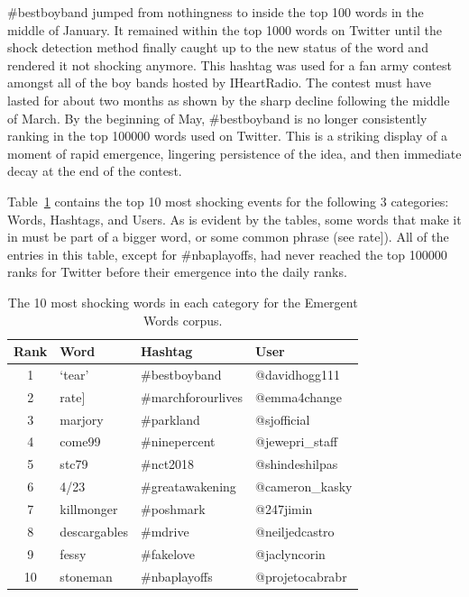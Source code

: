 \documentclass{article}
\begin{document}
\#bestboyband jumped from nothingness to inside the top 100 words in the middle
of January.
It remained within the top 1000 words on Twitter until the shock detection
method finally caught up to the new status of the word and rendered it not 
shocking anymore.
This hashtag was used for a fan army contest amongst all of the boy bands
hosted by IHeartRadio.
The contest must have lasted for about two months as shown by the sharp decline
following the middle of March.
By the beginning of May,
\#bestboyband is no longer consistently ranking in the top 100000 words used
on Twitter.
This is a striking display of a moment of rapid emergence,
lingering persistence of the idea,
and then immediate decay at the end of the contest.\par

Table~\ref{Tab:Emergent} contains the top 10 most shocking events for the
following 3 categories:
Words,
Hashtags,
and Users.
As is evident by the tables,
some words that make it in must be part of a bigger word,
or some common phrase (see rate]).
All of the entries in this table,
except for \#nbaplayoffs,
had never reached the top 100000 ranks for Twitter before their emergence
into the daily ranks.\par

\begin{table}
    \centering
    \caption{\label{Tab:Emergent} The 10 most shocking words in each category for 
the Emergent Words corpus.}
    \begin{tabular}{clll}
        \toprule
        Rank & Word & Hashtag & User \\
        \midrule
        1 & `tear' & \#bestboyband & @davidhogg111 \\
    2 & rate] & \#marchforourlives & @emma4change \\
        3 & marjory & \#parkland & @sjofficial \\
        4 & come99 & \#ninepercent & @jewepri\_staff \\
        5 & stc79 & \#nct2018 & @shindeshilpas \\
        6 & 4/23 & \#greatawakening & @cameron\_kasky \\
        7 & killmonger & \#poshmark & @247jimin \\
        8 & descargables & \#mdrive & @neiljedcastro \\
        9 & fessy & \#fakelove & @jaclyncorin \\
        10 & stoneman & \#nbaplayoffs & @projetocabrabr\\
        \bottomrule
    \end{tabular}
\end{table}
\end{document}
